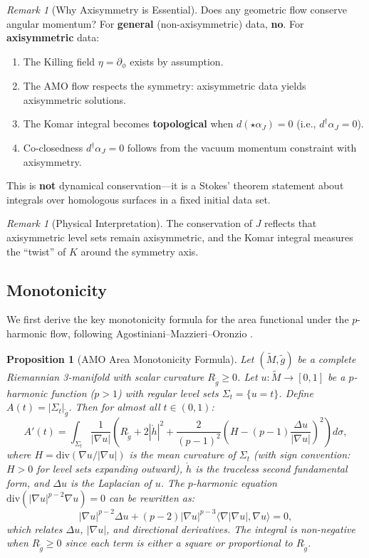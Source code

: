 \documentclass[12pt]{article}
\theoremstyle{plain}
\newtheorem{proposition}[theorem]{Proposition}
\theoremstyle{definition}
\theoremstyle{remark}
\newtheorem{remark}[theorem]{Remark}
\newcommand{\Div}{\mathrm{div}}
\newcommand{\tM}{\tilde{M}}
\newcommand{\tg}{\tilde{g}}
\begin{document}
\begin{remark}[Why Axisymmetry is Essential]
Does any geometric flow conserve angular momentum? For \textbf{general} (non-axisymmetric) data, \textbf{no}. For \textbf{axisymmetric} data:
\begin{enumerate}
    \item The Killing field $\eta = \partial_\phi$ exists by assumption.
    \item The AMO flow respects the symmetry: axisymmetric data yields axisymmetric solutions.
    \item The Komar integral becomes \textbf{topological} when $d(\star\alpha_J) = 0$ (i.e., $d^\dagger\alpha_J = 0$).
    \item Co-closedness $d^\dagger\alpha_J = 0$ follows from the vacuum momentum constraint with axisymmetry.
\end{enumerate}
This is \textbf{not} dynamical conservation---it is a Stokes' theorem statement about integrals over homologous surfaces in a fixed initial data set.
\end{remark}

\begin{remark}[Physical Interpretation]
The conservation of $J$ reflects that axisymmetric level sets remain axisymmetric, and the Komar integral measures the ``twist'' of $K$ around the symmetry axis.
\end{remark}

\subsection{Monotonicity}

We first derive the key monotonicity formula for the area functional under the $p$-harmonic flow, following Agostiniani--Mazzieri--Oronzio \cite{amo2022}.

\begin{proposition}[AMO Area Monotonicity Formula]\label{prop:amo-formula}
Let $(\tM, \tg)$ be a complete Riemannian 3-manifold with scalar curvature $R_{\tg} \geq 0$. Let $u: \tM \to [0, 1]$ be a $p$-harmonic function ($p > 1$) with regular level sets $\Sigma_t = \{u = t\}$. Define $A(t) = |\Sigma_t|_{\tg}$. Then for almost all $t \in (0,1)$:
\begin{equation}\label{eq:amo-formula}
A'(t) = \int_{\Sigma_t} \frac{1}{|\nabla u|}\left(R_{\tg} + 2|\mathring{h}|^2 + \frac{2}{(p-1)^2}\left(H - (p-1)\frac{\Delta u}{|\nabla u|}\right)^2\right) d\sigma,
\end{equation}
where $H = \Div(\nabla u/|\nabla u|)$ is the mean curvature of $\Sigma_t$ (with sign convention: $H > 0$ for level sets expanding outward), $\mathring{h}$ is the traceless second fundamental form, and $\Delta u$ is the Laplacian of $u$. The $p$-harmonic equation $\Div(|\nabla u|^{p-2}\nabla u) = 0$ can be rewritten as:
\[
|\nabla u|^{p-2}\Delta u + (p-2)|\nabla u|^{p-3}\langle \nabla|\nabla u|, \nabla u\rangle = 0,
\]
which relates $\Delta u$, $|\nabla u|$, and directional derivatives. The integral is non-negative when $R_{\tg} \geq 0$ since each term is either a square or proportional to $R_{\tg}$.
\end{proposition}
\end{document}

